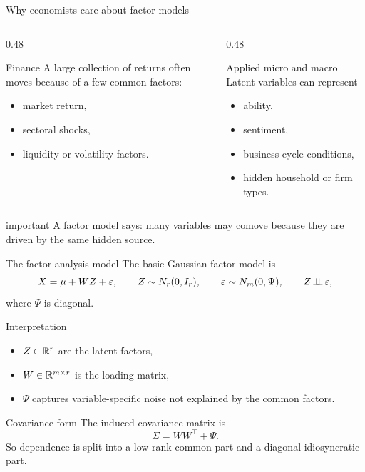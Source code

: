 \documentclass[dvipsnames,aspectratio=169,handout]{beamer}
\begin{document}
\begin{frame}{Why economists care about factor models}
\begin{columns}[T]
\begin{column}{0.48\textwidth}
\begin{block}{Finance}
A large collection of returns often moves because of a few common factors:
\begin{itemize}
    \item market return,
    \item sectoral shocks,
    \item liquidity or volatility factors.
\end{itemize}
\end{block}
\end{column}
\begin{column}{0.48\textwidth}
\begin{block}{Applied micro and macro}
\vspace{-2mm}
Latent variables can represent
\begin{itemize}
    \item ability,
    \item sentiment,
    \item business-cycle conditions,
    \item hidden household or firm types.
\end{itemize}
\end{block}
\end{column}
\end{columns}
\medskip

\begin{beamercolorbox}[wd=\textwidth,sep=7pt,center,rounded=true,shadow=true]{important}
A factor model says: many variables may comove because they are driven by the same hidden source.
\end{beamercolorbox}
\end{frame}

\begin{frame}{The factor analysis model}
The basic Gaussian factor model is
\[
X = \mu + WZ + \varepsilon,
\qquad
Z\sim N_r(0,I_r),
\qquad
\varepsilon\sim N_m(0,\Psi),
\qquad
Z\mbox{\,$\perp\!\!\!\perp$\,} \varepsilon,
\]
where $\Psi$ is diagonal.

\begin{block}{Interpretation}
\begin{itemize}
    \item $Z\in\mathbb{R}^r$ are the latent factors,
    \item $W\in\mathbb{R}^{m\times r}$ is the loading matrix,
    \item $\Psi$ captures variable-specific noise not explained by the common factors.
\end{itemize}
\end{block}

\begin{alertblock}{Covariance form}
The induced covariance matrix is
\[
\Sigma = WW^\top + \Psi.
\]
So dependence is split into a low-rank common part and a diagonal idiosyncratic part.
\end{alertblock}
\end{frame}
\end{document}
